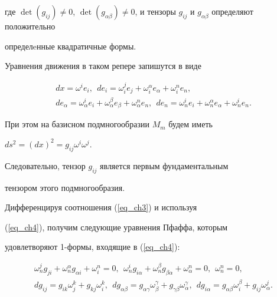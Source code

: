 где $\det (g_{ij})\neq 0$, $\det \left(g_{\alpha\beta}\right)\neq


0$, и тензоры $g_{ij}$ и $g_{\alpha\beta}$ определяют положительно


определeнные квадратичные формы.





Уравнения движения в таком репере запишутся в виде


\begin{equation}


\label{eq_ch4}


\begin{array}{c}


dx=\omega^ie_i,\ \  de_i=\omega^j_ie_j+\omega^{\alpha}_ie_{\alpha}+


\omega^n_ie_n,\\[2mm]


de_{\alpha}=\omega^i_{\alpha}e_i+\omega^{\beta}_{\alpha}e_{\beta}+


\omega^n_{\alpha}e_n,\ \


de_n=\omega^i_ne_i+\omega^{\alpha}_ne_{\alpha}+\omega^i_ne_n.


\end{array}


\end{equation}


При этом на базисном подмногообразии $M_m$ будем иметь


$ds^2=(dx)^2=g_{ij}\omega^i\omega^j$.


Следовательно, тензор $g_{ij}$ является первым фундаментальным


тензором этого подмногообразия.





Дифференцируя соотношения (\ref{eq_ch3}) и используя


(\ref{eq_ch4}), получим следующие уравнения Пфаффа, которым


удовлетворяют 1-формы, входящие в (\ref{eq_ch4}):


\begin{equation}


\label{eq_ch5}


\begin{array}{c}


\omega^j_ng_{ji}+\omega^{\alpha}_ng_{\alpha i}+\omega^n_i=0,


\ \  \omega^i_ng_{i\alpha}+\omega^{\beta}_ng_{\beta\alpha}+


\omega^n_{\alpha}=0, \ \  \omega^n_n=0, \\[2mm]


dg_{ij}=g_{ik}\omega^k_j+g_{kj}\omega^k_i,  \ \


dg_{\alpha\beta}=g_{\alpha\gamma}\omega^{\gamma}_{\beta}+


g_{\gamma\beta}\omega^{\gamma}_{\alpha}, \ \


dg_{i\alpha}=g_{\alpha\beta}\omega^{\beta}_i


+g_{ij}\omega^j_{\alpha}.


\end{array}


\end{equation}


